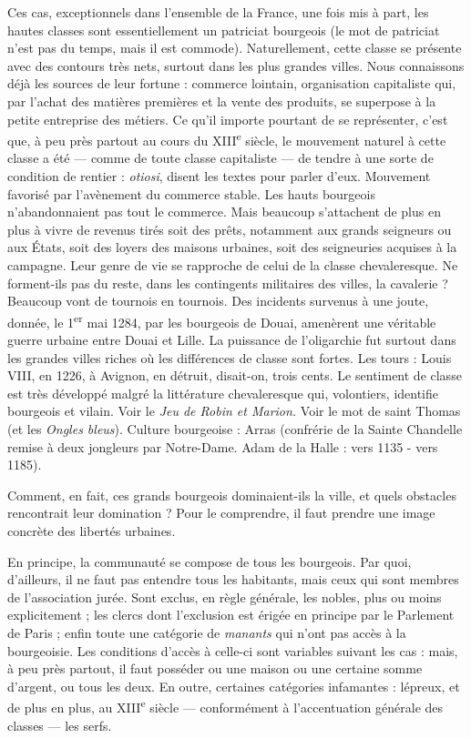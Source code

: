 \documentclass[french,twoside]{book} %
\begin{document}
Ces cas, exceptionnels dans l’ensemble de la France, une fois mis à part, les hautes classes sont essentiellement un patriciat bourgeois (le mot de patriciat n’est pas du temps, mais il est commode). Naturellement, cette classe se présente avec des contours très nets, surtout dans les plus grandes villes. Nous connaissons déjà les sources de leur fortune : commerce lointain, organisation capitaliste qui, par l’achat des matières premières et la vente des produits, se superpose à la petite entreprise des métiers. Ce qu’il importe pourtant de se représenter, c’est que, à peu près partout au cours du XIII\textsuperscript{e} siècle, le mouvement naturel à cette classe a été — comme de toute classe capitaliste — de tendre à une sorte de condition de rentier : {\itshape otiosi}, disent les textes pour parler d’eux. Mouvement favorisé par l’avènement du commerce stable. Les hauts bourgeois n’abandonnaient pas tout le commerce. Mais beaucoup s’attachent de plus en plus à vivre de revenus tirés soit des prêts, notamment aux grands seigneurs ou aux États, soit des loyers des maisons urbaines, soit des seigneuries acquises à la campagne. Leur genre de vie se rapproche de celui de la classe chevaleresque. Ne forment-ils pas du reste, dans les contingents militaires des villes, la cavalerie ? Beaucoup vont de tournois en tournois. Des incidents survenus à une joute, donnée, le 1\textsuperscript{er} mai 1284, par les bourgeois de Douai, amenèrent une véritable guerre urbaine entre Douai et Lille. La puissance de l’oligarchie fut surtout dans les grandes villes riches où les différences de classe sont fortes. Les tours : Louis VIII, en 1226, à Avignon, en détruit, disait-on, trois cents. Le sentiment  
\label{p75} de classe est très développé malgré la littérature chevaleresque qui, volontiers, identifie bourgeois et vilain. Voir le {\itshape Jeu de Robin et Marion.} Voir le mot de saint Thomas (et les {\itshape Ongles bleus}). Culture bourgeoise : Arras (confrérie de la Sainte Chandelle remise à deux jongleurs par Notre-Dame. Adam de la Halle : vers 1135 - vers 1185).\par
Comment, en fait, ces grands bourgeois dominaient-ils la ville, et quels obstacles rencontrait leur domination ? Pour le comprendre, il faut prendre une image concrète des libertés urbaines.\par
En principe, la communauté se compose de tous les bourgeois. Par quoi, d’ailleurs, il ne faut pas entendre tous les habitants, mais ceux qui sont membres de l’association jurée. Sont exclus, en règle générale, les nobles, plus ou moins explicitement ; les clercs dont l’exclusion est érigée en principe par le Parlement de Paris ; enfin toute une catégorie de \emph{manants} qui n’ont pas accès à la bourgeoisie. Les conditions d’accès à celle-ci sont variables suivant les cas : mais, à peu près partout, il faut posséder ou une maison ou une certaine somme d’argent, ou tous les deux. En outre, certaines catégories infamantes : lépreux, et de plus en plus, au XIII\textsuperscript{e} siècle — conformément à l’accentuation générale des classes — les serfs.\par
\end{document}
